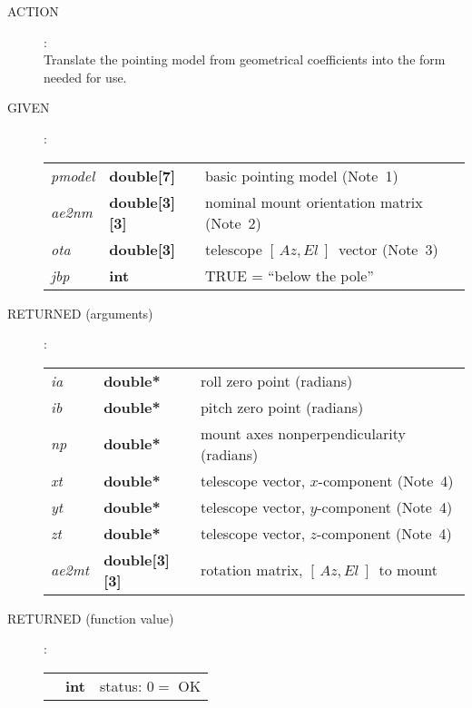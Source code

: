 \documentclass[12pt,fleqn,twoside]{article}
\renewcommand{\_}{{\tt\char'137}}     %
\newcommand{\azel}      {$[\,Az,El~]$}
\newcommand{\action}[1]
{
  \goodbreak
  \begin{description}
    \item[ACTION]: \\[0.5ex] \nopagebreak
        #1
  \end{description}
  \vspace{-3ex}
}
\newcommand{\args}[2]
{
  \goodbreak
  \begin{description}
  \item[#1]: \\[1.5ex] \nopagebreak
    \hspace*{-0.9em}
    \begin{tabular}{p{4.5em}p{5.8em}p{23.5em}}
      #2
    \end{tabular}
  \end{description}
  \vspace{-3ex}
}
\newcommand{\spec}[3]
{
  {\em {#1}} & {\bf \mbox{#2}} & {#3}
}
\begin{document}
\action{Translate the pointing model from geometrical coefficients into the
        form needed for use.}
\args{GIVEN}
{
\spec{pmodel}{double[7]}{basic pointing model (Note~1)} \\
\spec{ae2nm}{double[3][3]}{nominal mount orientation matrix (Note~2)} \\
\spec{ota}{double[3]}{telescope \azel\ vector (Note~3)} \\
\spec{jbp}{int}{TRUE = ``below the pole''}
}
\args{RETURNED \rm (arguments)}
{
\spec{ia}{double*}{roll zero point (radians)} \\
\spec{ib}{double*}{pitch zero point (radians)} \\
\spec{np}{double*}{mount axes nonperpendicularity (radians)} \\
\spec{xt}{double*}{telescope vector, $x$-component (Note~4)} \\
\spec{yt}{double*}{telescope vector, $y$-component (Note~4)} \\
\spec{zt}{double*}{telescope vector, $z$-component (Note~4)} \\
\spec{ae2mt}{double[3][3]}{rotation matrix, \azel\ to mount}
}
\args{RETURNED \rm (function value)}
{
\spec{}{int}{status: $0 =$ OK}
}
\end{document}
